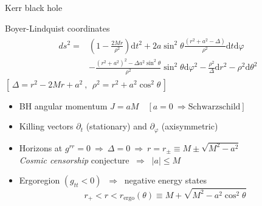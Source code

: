 \documentclass[9pt]{beamer}
\newcommand{\dd}{\mathrm{d}}
\begin{document}
\begin{frame}[fragile]{Kerr black hole}

    \vspace{0.15cm}

    \begin{block}{Boyer-Lindquist coordinates}
        \begin{align*}
            \begin{split}
                ds^2 = & \left(1 - \frac{2 M r}{\rho^2} \right) \dd t^2 + 2 a \sin^2\theta \frac{(r^2+a^2-\Delta)}{\rho^2} \dd t \dd \varphi \\
                &- \frac{(r^2+a^2)^2- \Delta a^2 \sin^2\theta}{\rho^2} \sin^2\theta \dd\varphi^2 - \frac{\rho^2}{\Delta} \dd r^2 - \rho^2 \dd \theta^2
            \end{split}
        \end{align*}
        \centering
        $\scriptstyle [\,\Delta=r^2 - 2 M r + a^2 ~,~~ \rho^2 = r^2 + a^2 \cos^2\theta\,]$
    \end{block}

    \begin{itemize}
        \setlength\itemsep{1em}
        \item BH angular momentum $J = a M \quad\left[ a=0 ~\Rightarrow \text{Schwarzschild} \right]$ 
        \item Killing vectors $\partial_t$ (stationary) and $\partial_\varphi$ (axisymmetric)
        \item Horizons at $g^{rr}=0 ~\Rightarrow~ \Delta=0 ~\Rightarrow~ r = r_{\pm} \equiv M \pm \sqrt{M^2-a^2}$ \\
        \emph{Cosmic censorship} conjecture $~\Rightarrow~$ $|a| \le M$
        
        \item \alert{Ergoregion} $(g_{tt}<0)$ $~\Rightarrow~$ negative energy states
        $$r_+<r<r_\mathrm{ergo}(\theta) \equiv M + \sqrt{M^2 - a^2 \cos^2\theta}$$
    \end{itemize}
\end{frame}
\end{document}
